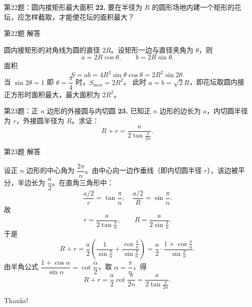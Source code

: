 \documentclass[10pt,aspectratio=169,serif]{beamer}
\begin{document}
\begin{frame}[t]{第22题：圆内接矩形最大面积}
\textbf{22.} 要在半径为 $R$ 的圆形场地内建一个矩形的花坛，应怎样截取，才能使花坛的面积最大？
\end{frame}

\begin{frame}[t]{第22题 解答}
\begin{tcolorbox}[colback=orange!10,colframe=orange,title=\textbf{解}]
圆内接矩形的对角线为圆的直径 $2R$。设矩形一边与直径夹角为 $\theta$，则
\[
a=2R\cos\theta,\qquad b=2R\sin\theta.
\]
面积
\[
S=ab=4R^2\sin\theta\cos\theta=2R^2\sin 2\theta.
\]
当 $\sin 2\theta=1$ 即 $\theta=\dfrac{\pi}{4}$ 时，$S_{\max}=2R^2$。
此时 $a=b=\sqrt2 R$，即花坛取圆内接正方形时面积最大，最大面积为 $2R^2$。
\end{tcolorbox}
\end{frame}

\begin{frame}[t]{第23题：正 $n$ 边形的外接圆与内切圆}
\textbf{23.} 已知正 $n$ 边形的边长为 $a$，内切圆半径为 $r$，外接圆半径为 $R$。求证：
\[
R+r=\frac{a}{2\tan\frac{\pi}{2n}}.
\]
\end{frame}

\begin{frame}[t]{第23题 解答}
\begin{tcolorbox}[colback=orange!10,colframe=orange,title=\textbf{证明}]
设正 $n$ 边形的中心角为 $\dfrac{2\pi}{n}$。由中心向一边作垂线（即内切圆半径 $r$），该边被平分，半边长为 $\dfrac{a}{2}$。在直角三角形中：
\[
\frac{a/2}{r}=\tan\frac{\pi}{n},\quad \frac{a/2}{R}=\sin\frac{\pi}{n}.
\]
故
\[
r=\frac{a}{2\tan\frac{\pi}{n}},\qquad R=\frac{a}{2\sin\frac{\pi}{n}}.
\]
于是
\[
R+r=\frac{a}{2}\!\left(\frac{1}{\sin\frac{\pi}{n}}+\frac{\cos\frac{\pi}{n}}{\sin\frac{\pi}{n}}\right)
=\frac{a}{2}\cdot\frac{1+\cos\frac{\pi}{n}}{\sin\frac{\pi}{n}}.
\]
由半角公式 $\dfrac{1+\cos\alpha}{\sin\alpha}=\cot\dfrac{\alpha}{2}$，取 $\alpha=\dfrac{\pi}{n}$，得
\[
R+r=\frac{a}{2}\cot\frac{\pi}{2n}=\frac{a}{2\tan\frac{\pi}{2n}}.
\]
\end{tcolorbox}
\end{frame}

\begin{frame}[c]
  \begin{center}
    {\Huge\calligra Thanks!}
  \end{center}
\end{frame}
\end{document}
